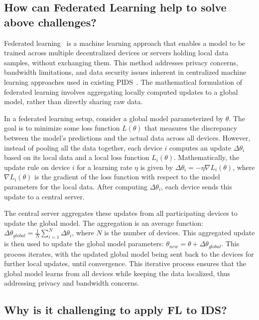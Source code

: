 \subsection{How can Federated Learning help to solve above challenges?}

Federated learning~\cite{mcmahan2017communication} is a machine learning approach that enables a model to be trained across multiple decentralized devices or servers holding local data samples, without exchanging them. This method addresses privacy concerns, bandwidth limitations, and data security issues inherent in centralized machine learning approaches used in existing PIDS~\cite{flash2024,cheng2023kairos,wang2022threatrace}. The mathematical formulation of federated learning involves aggregating locally computed updates to a global model, rather than directly sharing raw data.

In a federated learning setup, consider a global model parameterized by \(\theta\). The goal is to minimize some loss function \(L(\theta)\) that measures the discrepancy between the model's predictions and the actual data across all devices. However, instead of pooling all the data together, each device \(i\) computes an update \(\Delta \theta_i\) based on its local data and a local loss function \(L_i(\theta)\). Mathematically, the update rule on device \(i\) for a learning rate \(\eta\) is given by \(\Delta \theta_i = -\eta \nabla L_i(\theta)\), where \(\nabla L_i(\theta)\) is the gradient of the loss function with respect to the model parameters for the local data. After computing \(\Delta \theta_i\), each device sends this update to a central server.

The central server aggregates these updates from all participating devices to update the global model. The aggregation is an average function: \(\Delta \theta_{global} = \frac{1}{N} \sum_{i=1}^{N} \Delta \theta_i\), where \(N\) is the number of devices. This aggregated update is then used to update the global model parameters: \(\theta_{new} = \theta + \Delta \theta_{global}\). This process iterates, with the updated global model being sent back to the devices for further local updates, until convergence. This iterative process ensures that the global model learns from all devices while keeping the data localized, thus addressing privacy and bandwidth concerns.


\subsection{Why is it challenging to apply FL to IDS?}

